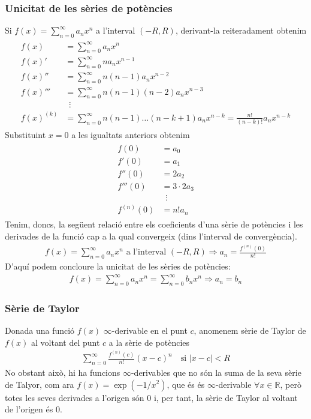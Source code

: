 \subsubsection*{Unicitat de les sèries de potències}
Si $f(x) = \sum_{n=0}^{\infty} a_{n} x^{n}$ a l'interval $(-R, R)$, derivant-la reiteradament obtenim
\begin{align}
\begin{split}
    f(x) & = \sum\limits_{n=0}^{\infty} a_{n} x^{n} \\
    f(x)' & = \sum\limits_{n=0}^{\infty} na_{n} x^{n-1} \\
    f(x)'' & = \sum\limits_{n=0}^{\infty} n(n-1)a_{n} x^{n-2} \\
    f(x)''' & = \sum\limits_{n=0}^{\infty} n(n-1)(n-2)a_{n} x^{n-3} \\
    & \, \, \, \vdots \\
    f(x)^{(k)} & = \sum\limits_{n=0}^{\infty} n(n-1) \dots (n-k+1) a_{n} x^{n-k} = \frac{n!}{(n-k)!} a_{n} x^{n-k}
\end{split}
\end{align}
Substituint $x=0$ a les igualtats anteriors obtenim
\begin{align}
\begin{split}
    f(0) & = a_{0}\\
    f'(0) & = a_{1}\\
    f''(0) & = 2 a_{2}\\
    f'''(0) & = 3 \cdot 2 a_{3}\\
    &\, \, \, \vdots \\
    f^{(n)}(0) & = n! a_{n}
\end{split}
\end{align}
Tenim, doncs, la següent relació entre els coeficients d'una sèrie de potències i les derivades de la funció cap a la qual convergeix (dins l'interval de convergència).
\begin{align}
    f(x) = \sum\limits_{n=0}^{\infty} a_{n} x^{n} \text{ a l'interval } (-R, R) \Rightarrow a_{n} = \frac{f^{(n)}(0)}{n!}
\end{align}
D'aquí podem concloure la unicitat de les sèries de potències:
\begin{align}
    f(x) = \sum\limits_{n=0}^{\infty} a_{n} x^{n} = \sum\limits_{n=0}^{\infty} b_{n} x^{n} \Rightarrow a_{n} = b_{n}
\end{align}

\subsubsection*{Sèrie de Taylor}
Donada una funció $f(x)$ $\infty$-derivable en el punt $c$, anomenem sèrie de Taylor de $f(x)$ al voltant del punt $c$ a la sèrie de potències
\begin{align}
    \sum\limits_{n=0}^{\infty} \frac{f^{(n)}(c)}{n!} (x-c)^{n} \quad \text{si } |x-c| < R
\end{align}
No obstant això, hi ha funcions $\infty$-derivables que no són la suma de la seva sèrie de Talyor, com ara $f(x) = \exp (-1/x^{2})$, que és és $\infty$-derivable $\forall x \in \mathbb{R}$, però totes les seves derivades a l'origen són 0 i, per tant, la sèrie de Taylor al voltant de l'origen és 0.

